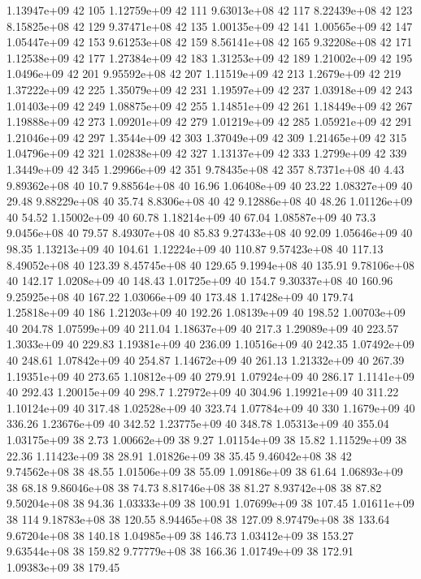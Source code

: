 1.13947e+09 42 105
1.12759e+09 42 111
9.63013e+08 42 117
8.22439e+08 42 123
8.15825e+08 42 129
9.37471e+08 42 135
1.00135e+09 42 141
1.00565e+09 42 147
1.05447e+09 42 153
9.61253e+08 42 159
8.56141e+08 42 165
9.32208e+08 42 171
1.12538e+09 42 177
1.27384e+09 42 183
1.31253e+09 42 189
1.21002e+09 42 195
1.0496e+09 42 201
9.95592e+08 42 207
1.11519e+09 42 213
1.2679e+09 42 219
1.37222e+09 42 225
1.35079e+09 42 231
1.19597e+09 42 237
1.03918e+09 42 243
1.01403e+09 42 249
1.08875e+09 42 255
1.14851e+09 42 261
1.18449e+09 42 267
1.19888e+09 42 273
1.09201e+09 42 279
1.01219e+09 42 285
1.05921e+09 42 291
1.21046e+09 42 297
1.3544e+09 42 303
1.37049e+09 42 309
1.21465e+09 42 315
1.04796e+09 42 321
1.02838e+09 42 327
1.13137e+09 42 333
1.2799e+09 42 339
1.3449e+09 42 345
1.29966e+09 42 351
9.78435e+08 42 357
8.7371e+08 40 4.43
9.89362e+08 40 10.7
9.88564e+08 40 16.96
1.06408e+09 40 23.22
1.08327e+09 40 29.48
9.88229e+08 40 35.74
8.8306e+08 40 42
9.12886e+08 40 48.26
1.01126e+09 40 54.52
1.15002e+09 40 60.78
1.18214e+09 40 67.04
1.08587e+09 40 73.3
9.0456e+08 40 79.57
8.49307e+08 40 85.83
9.27433e+08 40 92.09
1.05646e+09 40 98.35
1.13213e+09 40 104.61
1.12224e+09 40 110.87
9.57423e+08 40 117.13
8.49052e+08 40 123.39
8.45745e+08 40 129.65
9.1994e+08 40 135.91
9.78106e+08 40 142.17
1.0208e+09 40 148.43
1.01725e+09 40 154.7
9.30337e+08 40 160.96
9.25925e+08 40 167.22
1.03066e+09 40 173.48
1.17428e+09 40 179.74
1.25818e+09 40 186
1.21203e+09 40 192.26
1.08139e+09 40 198.52
1.00703e+09 40 204.78
1.07599e+09 40 211.04
1.18637e+09 40 217.3
1.29089e+09 40 223.57
1.3033e+09 40 229.83
1.19381e+09 40 236.09
1.10516e+09 40 242.35
1.07492e+09 40 248.61
1.07842e+09 40 254.87
1.14672e+09 40 261.13
1.21332e+09 40 267.39
1.19351e+09 40 273.65
1.10812e+09 40 279.91
1.07924e+09 40 286.17
1.1141e+09 40 292.43
1.20015e+09 40 298.7
1.27972e+09 40 304.96
1.19921e+09 40 311.22
1.10124e+09 40 317.48
1.02528e+09 40 323.74
1.07784e+09 40 330
1.1679e+09 40 336.26
1.23676e+09 40 342.52
1.23775e+09 40 348.78
1.05313e+09 40 355.04
1.03175e+09 38 2.73
1.00662e+09 38 9.27
1.01154e+09 38 15.82
1.11529e+09 38 22.36
1.11423e+09 38 28.91
1.01826e+09 38 35.45
9.46042e+08 38 42
9.74562e+08 38 48.55
1.01506e+09 38 55.09
1.09186e+09 38 61.64
1.06893e+09 38 68.18
9.86046e+08 38 74.73
8.81746e+08 38 81.27
8.93742e+08 38 87.82
9.50204e+08 38 94.36
1.03333e+09 38 100.91
1.07699e+09 38 107.45
1.01611e+09 38 114
9.18783e+08 38 120.55
8.94465e+08 38 127.09
8.97479e+08 38 133.64
9.67204e+08 38 140.18
1.04985e+09 38 146.73
1.03412e+09 38 153.27
9.63544e+08 38 159.82
9.77779e+08 38 166.36
1.01749e+09 38 172.91
1.09383e+09 38 179.45
